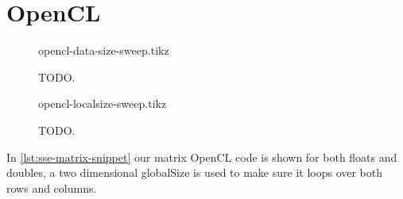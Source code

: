 \documentclass[final]{report}
\begin{document}
\chapter{OpenCL}

\begin{figure}[H]
\centering
    \setlength\figureheight{8cm}
    \setlength\figurewidth{\linewidth}
    {opencl-data-size-sweep.tikz}
    \caption{TODO.}
    \label{fig:opencl-data-size-sweep}
\end{figure}

\begin{figure}[H]
\centering
    \setlength\figureheight{8cm}
    \setlength\figurewidth{\linewidth}
    {opencl-localsize-sweep.tikz}
    \caption{TODO.}
    \label{fig:opencl-localsize-sweep}
\end{figure}


In \cref{lst:sse-matrix-snippet} our matrix OpenCL code is shown for both floats and doubles, a two dimensional globalSize is used to make sure it loops over both rows and columns.

\end{document}
